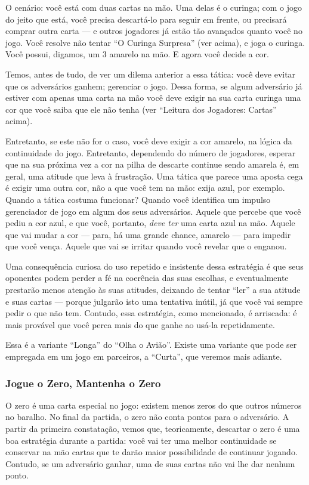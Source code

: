 O cenário: você está com duas cartas na mão. Uma delas é o curinga; com o jogo do jeito que está, você precisa descartá-lo para seguir em frente, ou precisará comprar outra carta --- e outros jogadores já estão tão avançados quanto você no jogo. Você resolve não tentar ``O Curinga Surpresa'' (ver acima), e joga o curinga. Você possui, digamos, um 3 amarelo na mão. E agora você decide a cor.

Temos, antes de tudo, de ver um dilema anterior a essa tática: você deve evitar que os adversários ganhem; gerenciar o jogo. Dessa forma, se algum adversário já estiver com apenas uma carta na mão você deve exigir na sua carta curinga uma cor que você saiba que ele não tenha (ver ``Leitura dos Jogadores: Cartas'' acima).

Entretanto, se este não for o caso, você deve exigir a cor amarelo, na lógica da continuidade do jogo. Entretanto, dependendo do número de jogadores, esperar que na sua próxima vez a cor na pilha de descarte continue sendo amarela é, em geral, uma atitude que leva à frustração. Uma tática que parece uma aposta cega é exigir uma outra cor, não a que você tem na mão: exija azul, por exemplo. Quando a tática costuma funcionar? Quando você identifica um impulso gerenciador de jogo em algum dos seus adversários. Aquele que percebe que você pediu a cor azul, e que você, portanto, \textit{deve ter} uma carta azul na mão. Aquele que vai mudar a cor --- para, há uma grande chance, amarelo --- para impedir que você vença. Aquele que vai se irritar quando você revelar que o enganou.

Uma consequência curiosa do uso repetido e insistente dessa estratégia é que seus oponentes podem perder a fé na coerência das suas escolhas, e eventualmente prestarão menos atenção às suas atitudes, deixando de tentar ``ler'' a sua atitude e suas cartas --- porque julgarão isto uma tentativa inútil, já que você vai sempre pedir o que não tem. Contudo, essa estratégia, como mencionado, é arriscada: é mais provável que você perca mais do que ganhe ao usá-la repetidamente.

Essa é a variante ``Longa'' do ``Olha o Avião''. Existe uma variante que pode ser empregada em um jogo em parceiros, a ``Curta'', que veremos mais adiante.

\subsubsection{Jogue o Zero, Mantenha o Zero}

O zero é uma carta especial no jogo: existem menos zeros do que outros números no baralho. No final da partida, o zero não conta pontos para o adversário. A partir da primeira constatação, vemos que, teoricamente, descartar o zero é uma boa estratégia durante a partida: você vai ter uma melhor continuidade se conservar na mão cartas que te darão maior possibilidade de continuar jogando. Contudo, se um adversário ganhar, uma de suas cartas não vai lhe dar nenhum ponto.

